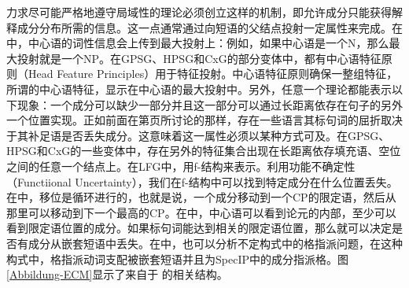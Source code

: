 力求尽可能严格地遵守局域性的理论必须创立这样的机制，即允许成分只能获得解释成分分布所需的信息。这一点通常通过向短语的父结点投射一定属性来完成。在\xbartc 中，中心语的词性信息会上传到最大投射上：例如，如果中心语是一个N，那么最大投射就是一个NP。在GPSG、HPSG和CxG的部分变体中，都有中心语特征原则（Head Feature Principles）用于特征投射。中心语特征原则确保一整组特征，所谓的中心语特征，显示在中心语的最大投射中。另外，任意一个理论都能表示以下现象：一个成分可以缺少一部分并且这一部分可以通过长距离依存在句子的另外一个位置实现。正如前面在第\pageref{page-Irish-complementizers}页所讨论的那样，存在一些语言其标句词的屈折取决于其补足语是否丢失成分。这意味着这一属性必须以某种方式可及。在GPSG、HPSG和CxG的一些变体中，存在另外的特征集合出现在长距离依存填充语、空位之间的任意一个结点上。在LFG中，用f-结构来表示。利用功能不确定性（Functiional Uncertainty），我们在f-结构中可以找到特定成分在什么位置丢失。在\gbtc 中，移位是循环进行的，也就是说，一个成分移动到一个CP的限定语，然后从那里可以移动到下一个最高的CP。在\gbtc 中，中心语可以看到论元的内部，至少可以看到限定语位置的成分。如果标句词能达到相关的限定语位置，那么就可以决定是否有成分从嵌套短语中丢失。在\gbtc 中，也可以分析不定构式中的格指派问题，在这种构式中，格指派动词支配被嵌套短语并且为\mbox{SpecIP}中的成分指派格。图\ref{Abbildung-ECM}显示了来自于 的相关结构。
